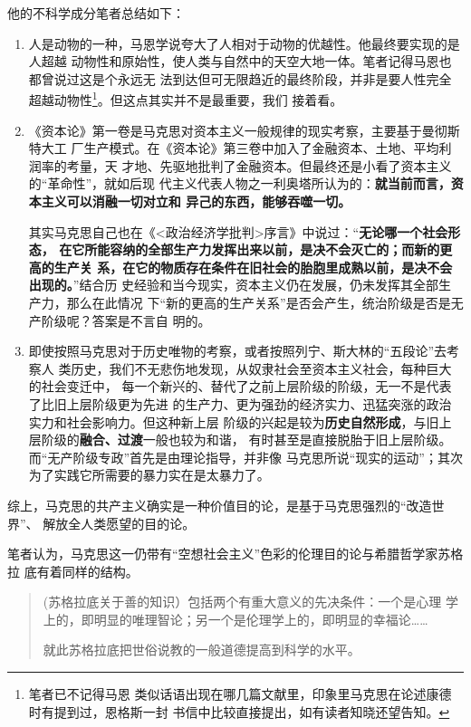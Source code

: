 他的不科学成分笔者总结如下：
\begin{enumerate}
\item 人是动物的一种，马恩学说夸大了人相对于动物的优越性。他最终要实现的是人超越
  动物性和原始性，使人类与自然中的天空大地一体。笔者记得马恩也都曾说过这是个永远无
  法到达但可无限趋近的最终阶段，并非是要人性完全超越动物性\footnote{笔者已不记得马恩
    类似话语出现在哪几篇文献里，印象里马克思在论述康德时有提到过，恩格斯一封
    书信中比较直接提出，如有读者知晓还望告知。}。但这点其实并不是最重要，我们
  接着看。

\item 《资本论》第一卷是马克思对资本主义一般规律的现实考察，主要基于曼彻斯特大工
  厂生产模式。在《资本论》第三卷中加入了金融资本、土地、平均利润率的考量，天
  才地、先驱地批判了金融资本。但最终还是小看了资本主义的“革命性”，就如后现
  代主义代表人物之一利奥塔所认为的：\textbf{就当前而言，资本主义可以消融一切对立和
    异己的东西，能够吞噬一切。}

  其实马克思自己也在《<政治经济学批判>序言》中说过：“\textbf{无论哪一个社会形态，
    在它所能容纳的全部生产力发挥出来以前，是决不会灭亡的；而新的更高的生产关
    系，在它的物质存在条件在旧社会的胎胞里成熟以前，是决不会出现的。}”结合历
  史经验和当今现实，资本主义仍在发展，仍未发挥其全部生产力，那么在此情况
  下“新的更高的生产关系”是否会产生，统治阶级是否是无产阶级呢？答案是不言自
  明的。

\item 即使按照马克思对于历史唯物的考察，或者按照列宁、斯大林的“五段论”去考察人
  类历史，我们不无悲伤地发现，从奴隶社会至资本主义社会，每种巨大的社会变迁中，
  每一个新兴的、替代了之前上层阶级的阶级，无一不是代表了比旧上层阶级更为先进
  的生产力、更为强劲的经济实力、迅猛突涨的政治实力和社会影响力。但这种新上层
  阶级的兴起是较为\textbf{历史自然形成}，与旧上层阶级的\textbf{融合、过渡}一般也较为和谐，
  有时甚至是直接脱胎于旧上层阶级。而“无产阶级专政”首先是由理论指导，并非像
  马克思所说“现实的运动”；其次为了实践它所需要的暴力实在是太暴力了。
\end{enumerate}

综上，马克思的共产主义确实是一种价值目的论，是基于马克思强烈的“改造世界”、
解放全人类愿望的目的论。

笔者认为，马克思这一仍带有“空想社会主义”色彩的伦理目的论与希腊哲学家苏格拉
底有着同样的结构。
\begin{quotation}
  (苏格拉底关于善的知识）包括两个有重大意义的先决条件：一个是心理
  学上的，即明显的唯理智论；另一个是伦理学上的，即明显的幸福论……

  就此苏格拉底把世俗说教的一般道德提高到科学的水平。
\end{quotation}

